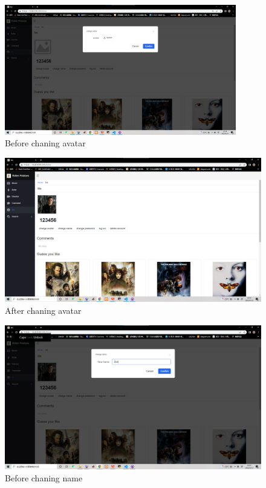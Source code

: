 \begin{CJK*}{UTF8}{gbsn}
\begin{figure}[htbp]
\centering
\includegraphics[width=0.9\textwidth]{res_avatar1.png}
\caption{Before chaning avatar}
\end{figure}


\begin{figure}[htbp]
\centering
\includegraphics[width=1\textwidth]{res_avatar2.png}
\caption{After chaning avatar}
\end{figure}



\begin{figure}[htbp]
\centering
\includegraphics[width=1\textwidth]{res_name1.png}
\caption{Before chaning name}
\end{figure}



\end{CJK*}
